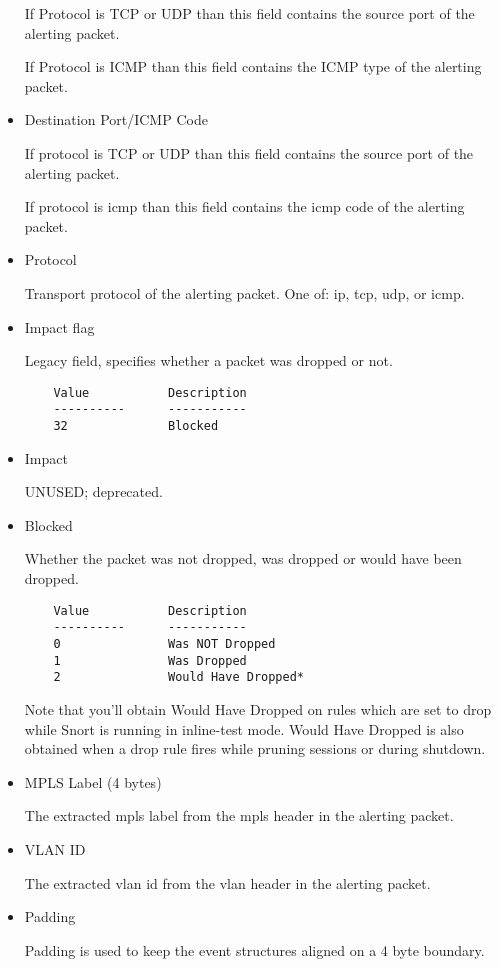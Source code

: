 \documentclass[english]{report}
\newenvironment{note}{
\samepage
    \vspace{10pt}{\textsf{
        {\hspace{7pt}\Huge{$\triangle$\hspace{-12.5pt}{\Large{$^!$}}}}\hspace{5pt}
        {\Large{NOTE}}
    }
    }
   \begin{center}
    \par\vspace{-17pt}

    \begin{lrbox}{\savepar}
    \begin{minipage}[r]{6in}
}
{
    \end{minipage}
    \end{lrbox}
    \fbox{
        \usebox{
            \savepar
	}
    }
    \par\vskip10pt
    \end{center}
}
\newenvironment{note}{
        \begin{rawhtml}
        <p><table border="1"><tr><td><b>
        Note:&nbsp;&nbsp;</b>
        \end{rawhtml}
}{
        \begin{rawhtml}
        </b></td></tr></table></p>
        \end{rawhtml}
}
\begin{document}
\begin{itemize}
    If Protocol is TCP or UDP than this field contains the source port
    of the alerting packet.

    If Protocol is ICMP than this field contains the ICMP type of the
    alerting packet.

\item Destination Port/ICMP Code

    If protocol is TCP or UDP than this field contains the source port
    of the alerting packet.

    If protocol is icmp than this field contains the icmp code of the
    alerting packet.
  
\item Protocol

    Transport protocol of the alerting packet. One of: ip, tcp, udp, or
    icmp.

\item Impact flag

    Legacy field, specifies whether a packet was dropped or not.

\begin{verbatim}
    Value           Description 
    ----------      -----------
    32              Blocked 
\end{verbatim}

\item Impact

    UNUSED; deprecated.

\item Blocked

    Whether the packet was not dropped, was dropped or would have been
    dropped. 

\begin{verbatim}
    Value           Description 
    ----------      -----------
    0               Was NOT Dropped 
    1               Was Dropped
    2               Would Have Dropped*
\end{verbatim}

\begin{note}
Note that you'll obtain Would Have Dropped on rules which are set to drop
while Snort is running in inline-test mode.  Would Have Dropped is also 
obtained when a drop rule fires while pruning sessions or during shutdown.
\end{note}

\item MPLS Label (4 bytes)

    The extracted mpls label from the mpls header in the alerting
    packet.

\item VLAN ID

    The extracted vlan id from the vlan header in the alerting packet.

\item Padding

    Padding is used to keep the event structures aligned on a 4 byte
    boundary.
\end{itemize}
\end{document}
